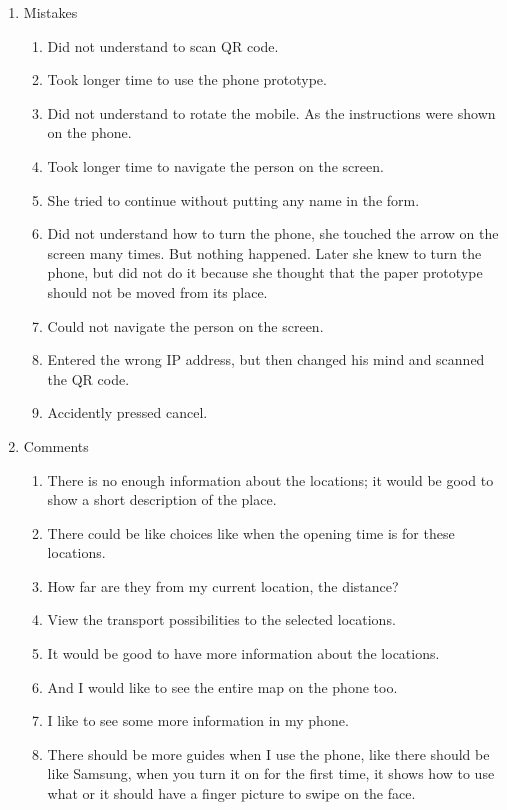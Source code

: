 \begin{enumerate}
\item Mistakes
\begin{enumerate}
\item  Did not understand to scan QR code.
\item  Took longer time to use the phone prototype. 
\item  Did not understand to rotate the mobile. As the instructions were shown on the phone.
\item  Took longer time to navigate the person on the screen.
\item  She tried to continue without putting any name in the form.
\item  Did not understand how to turn the phone, she touched the arrow on the screen many times. But nothing happened. Later she knew to turn the phone, but did not do it because she thought that the paper prototype should not be moved from its place.
\item  Could not navigate the person on the screen.
\item  Entered the wrong IP address, but then changed his mind and scanned the QR code.
\item  Accidently pressed cancel.
\end{enumerate}

\item Comments
\begin{enumerate}
\item  There is no enough information about the locations; it would be good to show a short description of the place.
\item  There could be like choices like when the opening time is for these locations.
\item  How far are they from my current location, the distance?
\item  View the transport possibilities to the selected locations.
\item  It would be good to have more information about the locations.
\item  And I would like to see the entire map on the phone too.
\item  I like to see some more information in my phone.
\item  There should be more guides when I use the phone, like there should be like Samsung, when you turn it on for the first time, it shows how to use what or it should have a finger picture to swipe on the face.
\end{enumerate}

\end{enumerate}

